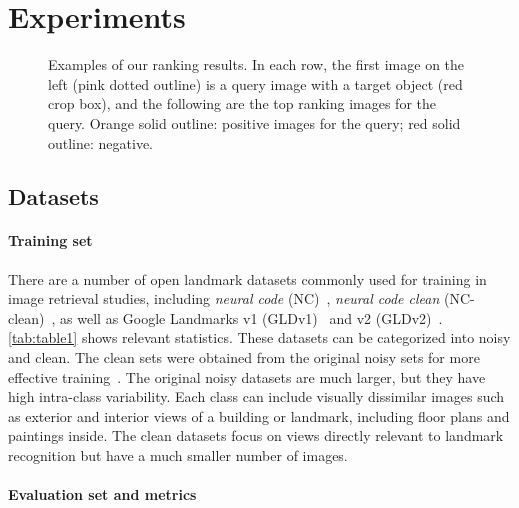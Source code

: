 \section{Experiments}
\label{sec:exp}

\begin{figure*}
\centering
{}
\caption{Examples of our ranking results. In each row, the first image on the left (pink dotted outline) is a query image with a target object (red crop box), and the following are the top ranking images for the query. Orange solid outline: positive images for the query; red solid outline: negative.}
\label{fig:fig8}
\end{figure*}

\subsection{Datasets}

\paragraph{Training set}

There are a number of open landmark datasets commonly used for training in image retrieval studies, including \emph{neural code} (NC)~\cite{Babenko01}, \emph{neural code clean} (NC-clean)~\cite{Gordo01}, as well as Google Landmarks v1 (GLDv1)~\cite{Noh01} and v2 (GLDv2)~\cite{Weyand01}. \autoref{tab:table1} shows relevant statistics. These datasets can be categorized into noisy and clean. The clean sets were obtained from the original noisy sets for more effective training~\cite{Gordo01, Weyand01}. The original noisy datasets are much larger, but they have high intra-class variability. Each class can include visually dissimilar images such as exterior and interior views of a building or landmark, including floor plans and paintings inside. The clean datasets focus on views directly relevant to landmark recognition but have a much smaller number of images.


\paragraph{Evaluation set and metrics}

